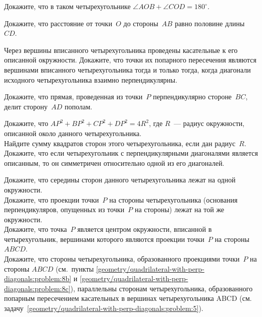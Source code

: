 \begin{problems}

\item
Докажите, что в таком четырехугольнике $\angle AOB + \angle COD = 180^\circ$.

\item
Докажите, что расстояние от точки~$O$ до стороны~$AB$ равно половине
длины~$CD$.

\item
\label{geometry/quadrilateral-with-perp-diagonals:problem:5}%
Через вершины вписанного четырехугольника проведены касательные к его описанной
окружности.
Докажите, что точки их попарного пересечения являются вершинами вписанного
четырехугольника тогда и только тогда, когда диагонали исходного
четырехугольника взаимно перпендикулярны.

\item
Докажите, что прямая, проведенная из точки~$P$ перпендикулярно стороне~$BC$,
делит сторону~$AD$ пополам.

\item
\sp
Докажите, что $AP^2 + BP^2 + CP^2 + DP^2 = 4 R^2$, где $R$~--- радиус
окружности, описанной около данного четырехугольника.
\\
\sp
Найдите сумму квадратов сторон этого четырехугольника, если дан радиус~$R$.
\\
\sp
\label{geometry/quadrilateral-with-perp-diagonals:problem:7c}%
Докажите, что если четырехугольник с перпендикулярными диагоналями является
описанным, то он симметричен относительно одной из его диагоналей.

\item
\sp
Докажите, что середины сторон данного четырехугольника лежат на одной
окружности.
\\
\sp
\label{geometry/quadrilateral-with-perp-diagonals:problem:8b}%
Докажите, что проекции точки~$P$ на стороны четырехугольника (основания
перпендикуляров, опущенных из точки~$P$ на стороны) лежат на той же окружности.
\\
\sp
\label{geometry/quadrilateral-with-perp-diagonals:problem:8c}%
Докажите, что точка~$P$ является центром окружности, вписанной
в четырехугольник, вершинами которого являются проекции точки~$P$
на стороны $ABCD$.
\\
\sp
Докажите, что стороны четырехугольника, образованного проекциями точки~$P$
на стороны $ABCD$
(см.~пункты \ref{geometry/quadrilateral-with-perp-diagonals:problem:8b}
и \ref{geometry/quadrilateral-with-perp-diagonals:problem:8c}),
параллельны сторонам четырехугольника, образованного попарным пересечением
касательных в вершинах четырехугольника ABCD
(см. задачу~\ref{geometry/quadrilateral-with-perp-diagonals:problem:5}).

\end{problems}

